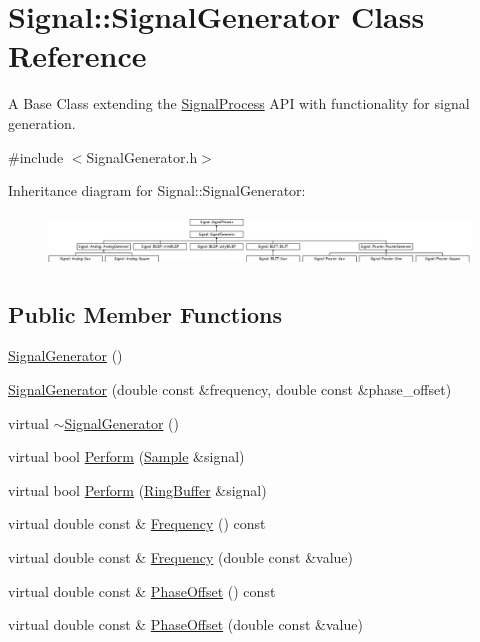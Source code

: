 \hypertarget{classSignal_1_1SignalGenerator}{\section{Signal\+:\+:Signal\+Generator Class Reference}
\label{classSignal_1_1SignalGenerator}
}


A Base Class extending the \hyperlink{classSignal_1_1SignalProcess}{Signal\+Process} A\+P\+I with functionality for signal generation.  




{\ttfamily \#include $<$Signal\+Generator.\+h$>$}

Inheritance diagram for Signal\+:\+:Signal\+Generator\+:\begin{figure}[H]
\begin{center}
\leavevmode
\includegraphics[height=1.346154cm]{classSignal_1_1SignalGenerator}
\end{center}
\end{figure}
\subsection*{Public Member Functions}
\begin{DoxyCompactItemize}
\item 
\hyperlink{classSignal_1_1SignalGenerator_a8c67c754d86e0363445d7fd271855e1a}{Signal\+Generator} ()
\item 
\hyperlink{classSignal_1_1SignalGenerator_a0a09e58b391b2e65af370bbf266b888c}{Signal\+Generator} (double const \&frequency, double const \&phase\+\_\+offset)
\item 
virtual \hyperlink{classSignal_1_1SignalGenerator_a2c0cb5fa941326bc206f45a07aa872ef}{$\sim$\+Signal\+Generator} ()
\item 
virtual bool \hyperlink{classSignal_1_1SignalGenerator_a2cd9061c5ae40a392a9476551b4379f3}{Perform} (\hyperlink{classSignal_1_1Sample}{Sample} \&signal)
\item 
virtual bool \hyperlink{classSignal_1_1SignalGenerator_a126d52dd9b6b14d33efc624e2c89284e}{Perform} (\hyperlink{classSignal_1_1RingBuffer}{Ring\+Buffer} \&signal)
\item 
virtual double const \& \hyperlink{classSignal_1_1SignalGenerator_a96af42ee68f94e9b04d034fd68b73ecd}{Frequency} () const 
\item 
virtual double const \& \hyperlink{classSignal_1_1SignalGenerator_af83b532bf3ddc3637c2fd7a1dfd095cb}{Frequency} (double const \&value)
\item 
virtual double const \& \hyperlink{classSignal_1_1SignalGenerator_ac2538ec946f001e394d2416fda698d1c}{Phase\+Offset} () const 
\item 
virtual double const \& \hyperlink{classSignal_1_1SignalGenerator_ac6a103ff72beaa338f6d18c812522d78}{Phase\+Offset} (double const \&value)
\end{DoxyCompactItemize}
